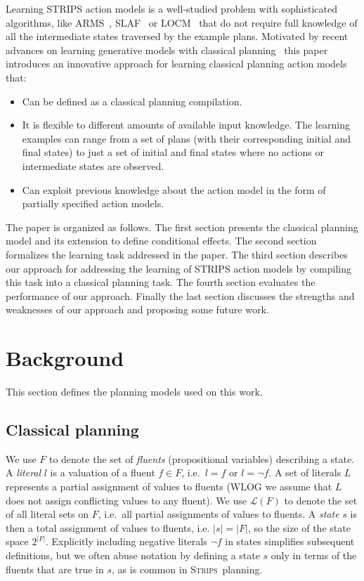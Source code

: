 \documentclass[letterpaper]{article} %
\newcommand{\strips}{\textsc{Strips}}     %
\begin{document}
Learning STRIPS action models is a well-studied problem with sophisticated algorithms, like {\sc ARMS}~\cite{yang2007learning}, {\sc SLAF}~\cite{amir:alearning:JAIR08} or {\sc LOCM}~\cite{cresswell2013acquiring} that do not require full knowledge of all the intermediate states traversed by the example plans. Motivated by recent advances on learning generative models with classical planning~\cite{bonet2009automatic,segovia2016hierarchical,segovia2017generating} this paper introduces an innovative approach for learning classical planning action models that:
\begin{itemize}
\item Can be defined as a classical planning compilation.
\item It is flexible to different amounts of available input knowledge. The learning examples can range from a set of plans (with their corresponding initial and final states) to just a set of initial and final states where no actions or intermediate states are observed.
\item Can exploit previous knowledge about the action model in the form of partially specified action models.
\end{itemize}

The paper is organized as follows. The first section presents the classical planning model and its extension to define conditional effects. The second section formalizes the learning task addressed in the paper. The third section describes our approach for addressing the learning of STRIPS action models by compiling this task into a classical planning task. The fourth section evaluates the performance of our approach. Finally the last section discusses  the strengths and weaknesses of our approach and proposing some future work. 
 


\section{Background}
This section defines the planning models used on this work.

\subsection{Classical planning}
We use $F$ to denote the set of {\em fluents} (propositional variables) describing a state. A {\em literal} $l$ is a valuation of a fluent $f\in F$, i.e.~$l=f$ or $l=\neg f$. A set of literals $L$ represents a partial assignment of values to fluents (WLOG we assume that $L$ does not assign conflicting values to any fluent). We use $\mathcal{L}(F)$ to denote the set of all literal sets on $F$, i.e.~all partial assignments of values to fluents. A {\em state} $s$ is then a total assignment of values to fluents, i.e. $|s|=|F|$, so the size of the state space $2^{|F|}$. Explicitly including negative literals $\neg f$ in states simplifies subsequent definitions, but we often abuse notation by defining a state $s$ only in terms of the fluents that are true in $s$, as is common in \strips\ planning.
\end{document}
